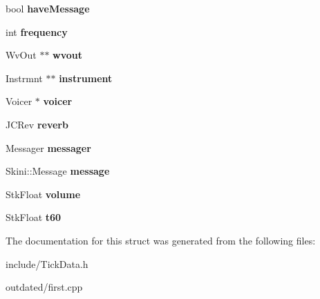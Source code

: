 \begin{DoxyCompactItemize}
\item 
bool {\bfseries have\+Message}\hypertarget{structTickData_a142d947db0ab6e66f8f912c51a4bafdb}{}\label{structTickData_a142d947db0ab6e66f8f912c51a4bafdb}

\item 
int {\bfseries frequency}\hypertarget{structTickData_ade8d551a52ad93b8f056bf5da813c64c}{}\label{structTickData_ade8d551a52ad93b8f056bf5da813c64c}

\item 
Wv\+Out $\ast$$\ast$ {\bfseries wvout}\hypertarget{structTickData_a99559444aee6dbc126f650744c5487ec}{}\label{structTickData_a99559444aee6dbc126f650744c5487ec}

\item 
Instrmnt $\ast$$\ast$ {\bfseries instrument}\hypertarget{structTickData_aa2b6f7f6ad9c886711e9393aca979677}{}\label{structTickData_aa2b6f7f6ad9c886711e9393aca979677}

\item 
Voicer $\ast$ {\bfseries voicer}\hypertarget{structTickData_ade98160894388bc8534d2003a7a63ffe}{}\label{structTickData_ade98160894388bc8534d2003a7a63ffe}

\item 
J\+C\+Rev {\bfseries reverb}\hypertarget{structTickData_a3d1563b3668509206700be3e02138827}{}\label{structTickData_a3d1563b3668509206700be3e02138827}

\item 
Messager {\bfseries messager}\hypertarget{structTickData_a3d0c2a9deef2fd2bd94b3ba8c6b176eb}{}\label{structTickData_a3d0c2a9deef2fd2bd94b3ba8c6b176eb}

\item 
Skini\+::\+Message {\bfseries message}\hypertarget{structTickData_a3061482937dae6c292d4d51400a6143a}{}\label{structTickData_a3061482937dae6c292d4d51400a6143a}

\item 
Stk\+Float {\bfseries volume}\hypertarget{structTickData_a6d0680a0bcc9d2c35104ad9721777223}{}\label{structTickData_a6d0680a0bcc9d2c35104ad9721777223}

\item 
Stk\+Float {\bfseries t60}\hypertarget{structTickData_adf8ffe69c6880e995aec842a032ee9fe}{}\label{structTickData_adf8ffe69c6880e995aec842a032ee9fe}

\end{DoxyCompactItemize}


The documentation for this struct was generated from the following files\+:\begin{DoxyCompactItemize}
\item 
include/Tick\+Data.\+h\item 
outdated/first.\+cpp\end{DoxyCompactItemize}
